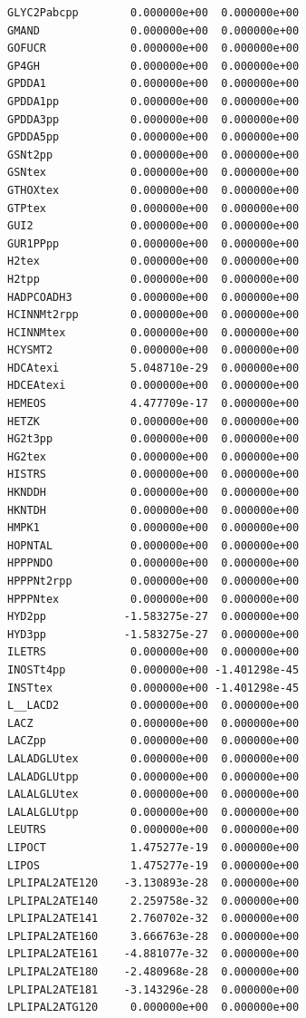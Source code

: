 \documentclass{scrartcl}
\begin{document}
\begin{enumerate}
\begin{lstlisting}
GLYC2Pabcpp        0.000000e+00  0.000000e+00
GMAND              0.000000e+00  0.000000e+00
GOFUCR             0.000000e+00  0.000000e+00
GP4GH              0.000000e+00  0.000000e+00
GPDDA1             0.000000e+00  0.000000e+00
GPDDA1pp           0.000000e+00  0.000000e+00
GPDDA3pp           0.000000e+00  0.000000e+00
GPDDA5pp           0.000000e+00  0.000000e+00
GSNt2pp            0.000000e+00  0.000000e+00
GSNtex             0.000000e+00  0.000000e+00
GTHOXtex           0.000000e+00  0.000000e+00
GTPtex             0.000000e+00  0.000000e+00
GUI2               0.000000e+00  0.000000e+00
GUR1PPpp           0.000000e+00  0.000000e+00
H2tex              0.000000e+00  0.000000e+00
H2tpp              0.000000e+00  0.000000e+00
HADPCOADH3         0.000000e+00  0.000000e+00
HCINNMt2rpp        0.000000e+00  0.000000e+00
HCINNMtex          0.000000e+00  0.000000e+00
HCYSMT2            0.000000e+00  0.000000e+00
HDCAtexi           5.048710e-29  0.000000e+00
HDCEAtexi          0.000000e+00  0.000000e+00
HEMEOS             4.477709e-17  0.000000e+00
HETZK              0.000000e+00  0.000000e+00
HG2t3pp            0.000000e+00  0.000000e+00
HG2tex             0.000000e+00  0.000000e+00
HISTRS             0.000000e+00  0.000000e+00
HKNDDH             0.000000e+00  0.000000e+00
HKNTDH             0.000000e+00  0.000000e+00
HMPK1              0.000000e+00  0.000000e+00
HOPNTAL            0.000000e+00  0.000000e+00
HPPPNDO            0.000000e+00  0.000000e+00
HPPPNt2rpp         0.000000e+00  0.000000e+00
HPPPNtex           0.000000e+00  0.000000e+00
HYD2pp            -1.583275e-27  0.000000e+00
HYD3pp            -1.583275e-27  0.000000e+00
ILETRS             0.000000e+00  0.000000e+00
INOSTt4pp          0.000000e+00 -1.401298e-45
INSTtex            0.000000e+00 -1.401298e-45
L__LACD2           0.000000e+00  0.000000e+00
LACZ               0.000000e+00  0.000000e+00
LACZpp             0.000000e+00  0.000000e+00
LALADGLUtex        0.000000e+00  0.000000e+00
LALADGLUtpp        0.000000e+00  0.000000e+00
LALALGLUtex        0.000000e+00  0.000000e+00
LALALGLUtpp        0.000000e+00  0.000000e+00
LEUTRS             0.000000e+00  0.000000e+00
LIPOCT             1.475277e-19  0.000000e+00
LIPOS              1.475277e-19  0.000000e+00
LPLIPAL2ATE120    -3.130893e-28  0.000000e+00
LPLIPAL2ATE140     2.259758e-32  0.000000e+00
LPLIPAL2ATE141     2.760702e-32  0.000000e+00
LPLIPAL2ATE160     3.666763e-28  0.000000e+00
LPLIPAL2ATE161    -4.881077e-32  0.000000e+00
LPLIPAL2ATE180    -2.480968e-28  0.000000e+00
LPLIPAL2ATE181    -3.143296e-28  0.000000e+00
LPLIPAL2ATG120     0.000000e+00  0.000000e+00

\end{lstlisting}
\end{enumerate}
\end{document}
